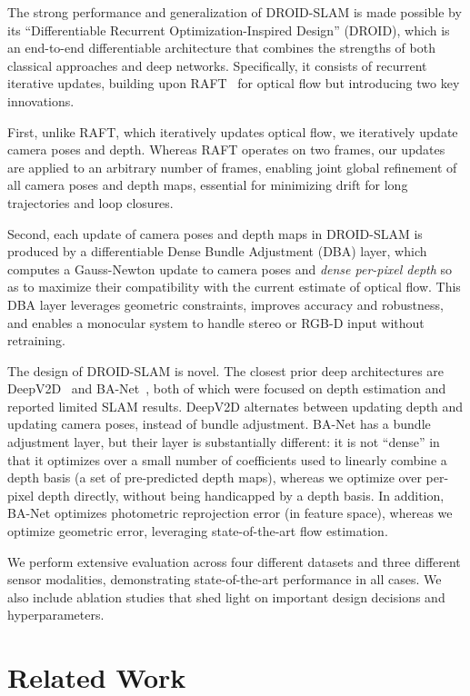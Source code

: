 \documentclass{article}
\newcommand{\methodname}{DROID-SLAM}
\begin{document}
The strong performance and generalization of \methodname{} is made possible by its  ``Differentiable Recurrent Optimization-Inspired Design'' (DROID), which is an end-to-end differentiable architecture that combines the strengths of both classical approaches and deep networks. Specifically, it consists of recurrent iterative updates, building upon RAFT~\cite{raft} for optical flow but introducing two key innovations.

First, unlike RAFT, which iteratively updates optical flow, we iteratively update camera poses and depth. Whereas RAFT operates on two frames, our updates are applied to an arbitrary number of frames, enabling joint global refinement of all camera poses and depth maps, essential for minimizing drift for long trajectories and loop closures.

Second, each update of camera poses and depth maps in \methodname{} is produced by a differentiable Dense Bundle Adjustment (DBA) layer, which computes a Gauss-Newton update to camera poses and \emph{dense per-pixel depth} so as to maximize their compatibility with the current estimate of optical flow. This DBA layer leverages geometric constraints,  improves accuracy and robustness, and enables a monocular system to handle stereo or RGB-D input without retraining.

The design of \methodname{} is novel. The closest prior deep architectures are DeepV2D~\cite{deepv2d} and BA-Net~\cite{banet}, both of which were focused on depth estimation and reported limited SLAM results. DeepV2D alternates between updating depth and updating camera poses, instead of bundle adjustment. BA-Net has a bundle adjustment layer, but their layer is substantially different: it is not ``dense'' in that it optimizes over a small number of coefficients used to linearly combine a depth basis (a set of pre-predicted depth maps), whereas we optimize over per-pixel depth directly, without being handicapped by a depth basis. In addition, BA-Net optimizes photometric reprojection error (in feature space), whereas we optimize geometric error, leveraging state-of-the-art flow estimation.

We perform extensive evaluation across four different datasets and three different sensor modalities, demonstrating state-of-the-art performance in all cases. We also include ablation studies that shed light on important design decisions and hyperparameters.

\section{Related Work}
\end{document}
